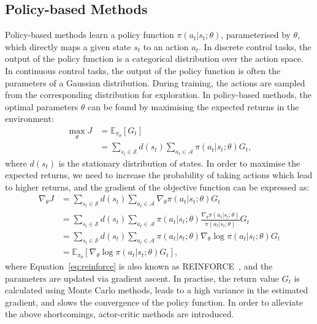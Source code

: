 \subsection{Policy-based Methods}
\label{ch3:policy-based}
Policy-based methods learn a policy function $\pi(a_{t}|s_{t};{\theta})$, parameterised by $\theta$, which directly maps a given state $s_{t}$ to an action $a_{t}$. In discrete control tasks, the output of the policy function is a categorical distribution over the action space. In continuous control tasks, the output of the policy function is often the parameters of a Gaussian distribution. During training, the actions are sampled from the corresponding distribution for exploration. In policy-based methods, the optimal parameters $\theta$ can be found by maximising the expected returns in the environment:
\begin{align}
    \max_{\theta}J & = \mathbb{E}_{\pi_{\theta}}[G_{t}] \\
                   & = \sum_{s_{t}\in\mathcal{S}}d(s_{t})\sum_{a_{t}\in\mathcal{A}}\pi(a_{t}|s_{t};\theta)G_{t},
\end{align}
where $d(s_{t})$ is the stationary distribution of states. In order to maximise the expected returns, we need to increase the probability of taking actions which lead to higher returns, and the gradient of the objective function can be expressed as:
\begin{align}
    \nabla_{\theta} J &= \sum_{s_{t}\in\mathcal{S}}d(s_{t})\sum_{a_{t}\in\mathcal{A}}\nabla_{\theta}\pi(a_{t}|s_{t};\theta)G_{t} \\
    &= \sum_{s_{t}\in\mathcal{S}}d(s_{t})\sum_{a_{t}\in\mathcal{A}}\pi(a_{t}|s_{t};\theta)\frac{\nabla_{\theta}\pi(a_{t}|s_{t};\theta)}{\pi(a_{t}|s_{t};\theta)}G_{t}\\
    &= \sum_{s_{t}\in\mathcal{S}}d(s_{t})\sum_{a_{t}\in\mathcal{A}}\pi(a_{t}|s_{t};\theta)\nabla_{\theta}\log\pi(a_{t}|s_{t};\theta)G_{t} \\
    &=\mathbb{E}_{\pi_{\theta}}[\nabla_{\theta}\log\pi(a_{t}|s_{t};\theta)G_{t}], \label{eq:reinforce}
\end{align}
where Equation~\eqref{eq:reinforce} is also known as REINFORCE~\cite{williams1992simple}, and the parameters are updated via gradient ascent. In practise, the return value $G_{t}$ is calculated using Monte Carlo methods, leads to a high variance in the estimated gradient, and slows the convergence of the policy function. In order to alleviate the above shortcomings, actor-critic methods are introduced. 
\newpage
